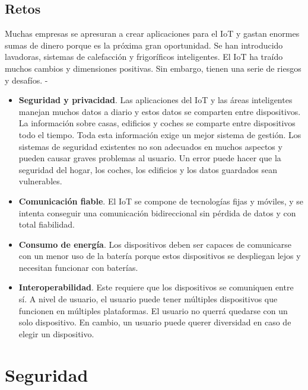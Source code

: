 {\subsection{Retos}

Muchas empresas se apresuran a crear aplicaciones para el IoT y gastan enormes sumas de dinero porque es la próxima gran oportunidad. Se han introducido lavadoras, sistemas de calefacción y frigoríficos inteligentes. El IoT ha traído muchos cambios y dimensiones positivas. Sin embargo, tienen una serie de riesgos y desafíos. \cite{8320780}-\cite{tripathy2017internet}

\begin{itemize}
    \item \textbf{Seguridad y privacidad}. Las aplicaciones del IoT y las áreas inteligentes manejan muchos datos a diario y estos datos se comparten entre dispositivos. La información sobre casas, edificios y coches se comparte entre dispositivos todo el tiempo. Toda esta información exige un mejor sistema de gestión. Los sistemas de seguridad existentes no son adecuados en muchos aspectos y pueden causar graves problemas al usuario. Un error puede hacer que la seguridad del hogar, los coches, los edificios y los datos guardados sean vulnerables.
    \item \textbf{Comunicación fiable}. El IoT se compone de tecnologías fijas y móviles, y se intenta conseguir una comunicación bidireccional sin pérdida de datos y con total fiabilidad.
    \item \textbf{Consumo de energía}. Los dispositivos deben ser capaces de comunicarse con un menor uso de la batería porque estos dispositivos se despliegan lejos y necesitan funcionar con baterías.
    \item \textbf{Interoperabilidad}. Este requiere que los dispositivos se comuniquen entre sí. A nivel de usuario, el usuario puede tener múltiples dispositivos que funcionen en múltiples plataformas. El usuario no querrá quedarse con un solo dispositivo. En cambio, un usuario puede querer diversidad en caso de elegir un dispositivo.
\end{itemize}


\section{Seguridad}

}
